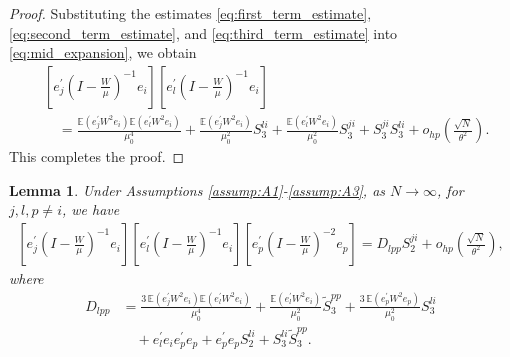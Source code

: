 \documentclass[11pt, reqno]{amsart}
\numberwithin{equation}{section}
\newtheorem{lemma}{Lemma}[section]
\begin{document}
\begin{proof}
Substituting the estimates \eqref{eq:first_term_estimate}, \eqref{eq:second_term_estimate}, and \eqref{eq:third_term_estimate} into \eqref{eq:mid_expansion}, we obtain
\begin{align*}
& \left[e_j^\prime\left(I - \frac{W}{\mu}\right)^{-1}e_i\right]\left[e_l^\prime\left(I - \frac{W}{\mu}\right)^{-1}e_i\right]  \\
&\quad = \frac{\mathbb E(e_j^\prime W^2 e_i) \mathbb E(e_l^\prime W^2 e_i)}{\mu_0^4} + \frac{\mathbb E(e_j^\prime W^2 e_i)}{\mu_0^2} S_3^{li} + \frac{\mathbb E(e_l^\prime W^2 e_i)}{\mu_0^2} S_3^{ji} + S_3^{ji}S_3^{li} + o_{hp}\left( \frac{\sqrt{N}}{\theta^2}\right).
\end{align*}
This completes the proof.
\end{proof}

\begin{lemma}\label{EigenVector.3}
Under Assumptions \ref{assump:A1}-\ref{assump:A3}, as $N \to \infty$, for $j,l,p \ne i$, we have
\begin{align*}
\left[e_j^\prime\left(I - \frac{W}{\mu}\right)^{-1}e_i\right]
\left[e_l^\prime\left(I - \frac{W}{\mu}\right)^{-1}e_i\right]
\left[e_p^\prime\left(I - \frac{W}{\mu}\right)^{-2}e_p\right] 
= D_{lpp}S_2^{ji} + o_{hp}\left( \frac{\sqrt{N}}{\theta^2}\right),
\end{align*}
where
\begin{align*}
D_{lpp} &= \frac{3\,\mathbb E(e_j^\prime W^2 e_i) \mathbb E(e_l^\prime W^2 e_i)}{\mu_0^4}
+ \frac{\mathbb E(e_l^\prime W^2 e_i)}{\mu_0^2}\tilde S_3^{pp}
+ \frac{3\,\mathbb E(e_p^\prime W^2 e_p)}{\mu_0^2}S_3^{li} \\
&\quad + e_l^\prime e_i e_p^\prime e_p + e_p^\prime e_p S_2^{li} + S_3^{li}\tilde S_3^{pp}.
\end{align*}
\end{lemma}
\end{document}

